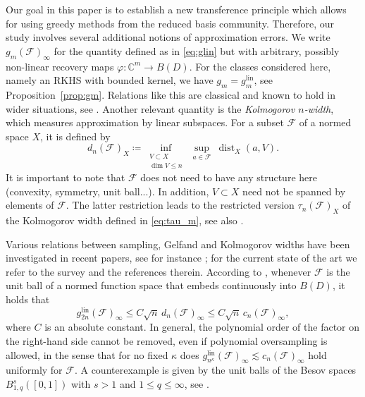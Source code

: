 \documentclass[11pt,reqno, a4paper]{article}
\numberwithin{equation}{section}
\DeclareMathOperator{\dist}{dist}
\newcommand{\C}{\mathbb{C}}
\newcommand{\lin}{\ensuremath{\mathrm{lin}}}
\begin{document}
Our goal in this paper is to establish a new transference principle which allows for using greedy methods from the reduced basis community. Therefore, our study involves several additional notions of approximation errors.
We write $g_m(\mathcal{F})_\infty$ for the quantity defined as in \eqref{eq:glin} but with arbitrary, possibly non-linear recovery maps $\varphi\colon\C^m\to B(D)$.
For the classes considered here, namely an RKHS with bounded kernel, we have $g_m=g_m^{\lin}$, see Proposition~\ref{prop:gm}.
Relations like this are classical and known to hold in wider situations, see \cite[Sect.\ 4.2.2]{NW1}.
Another relevant quantity is the \emph{Kolmogorov $n$-width}, which measures approximation by linear subspaces.
For a subset $\mathcal F$ of a normed space $X$, it is defined by
\begin{equation}\label{eq:dn-general}
  d_n(\mathcal F)_X \coloneqq \inf_{\substack{V\subset X\\ \dim V\le n}} \ \sup_{a\in\mathcal F} \ \dist_X(a,V) .
\end{equation}
It is important to note that $\mathcal F$ does not need to have any structure here (convexity, symmetry, unit ball...). In addition, $V \subset X$ need not be spanned by elements of $\mathcal F$. 
The latter restriction leads to the restricted version $\tau_n(\mathcal{F})_X$ of the Kolmogorov width defined in \eqref{eq:tau_m}, see also \cite{Wojtaszczyk15}.   
 
Various relations between sampling, Gelfand and Kolmogorov widths have been investigated in recent papers, see for instance \cite{KPUU24}; for the current state of the art we refer to the survey \cite{Survey26} and the references therein.
According to \cite[Thm.~20 and eq.~(14)]{KPUU24}, whenever $\mathcal{F}$ is the unit ball of a normed function space that embeds continuously into $B(D)$, it holds that
\begin{equation}\label{eq:KPUU-sqrtn}
g_{2n}^{\lin}(\mathcal{F})_\infty \le C\sqrt{n}\, d_n(\mathcal{F})_\infty \leq C\sqrt{n}\,c_n(\mathcal{F})_\infty,
\end{equation}
where $C$ is an absolute constant.
In general, the polynomial order of the factor on the right-hand side cannot be removed, even if polynomial oversampling is allowed, in the sense that for no fixed $\kappa$ does $g_{n^{\kappa}}^{\lin} (\mathcal{F})_\infty  \lesssim c_n (\mathcal{F})_\infty$ hold uniformly for $\mathcal{F}$. 
A counterexample is given by the unit balls of the Besov spaces $B^s_{1,q}([0,1])$ with $s>1$ and $1\leq q \leq \infty$, see \cite[Sec.~5.3]{KPUU24}.
 
\end{document}
